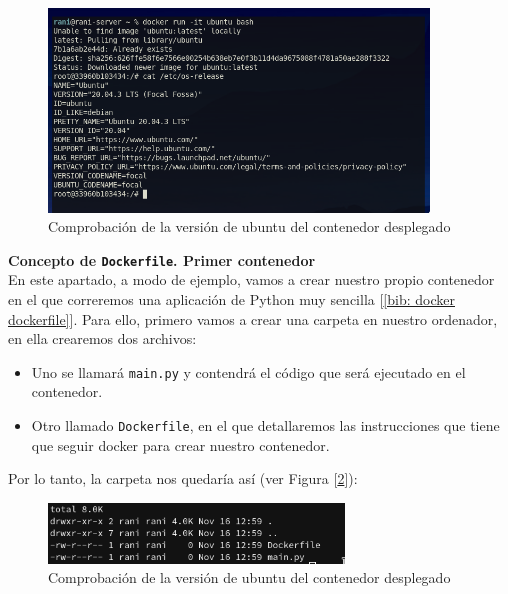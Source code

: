 \documentclass[a4paper, oneside, 12pt]{book}
\begin{document}
	\begin{figure}[h]
		\begin{center}
			\includegraphics[width=0.9\textwidth]{img/docker_ubuntu_ver.png}
			\caption{Comprobación de la versión de ubuntu del contenedor desplegado}
			\label{img: docker ubuntu ver}
		\end{center}
	\end{figure}

	\pagebreak

	\noindent \textbf{\large Concepto de \texttt{Dockerfile}. Primer contenedor}\\
	
	\noindent En este apartado, a modo de ejemplo, vamos a crear nuestro propio contenedor en el que correremos una aplicación de Python muy sencilla [\ref{bib: docker dockerfile}]. Para ello, primero vamos a crear una carpeta en nuestro ordenador, en ella crearemos dos archivos:
	\begin{itemize}
		\item Uno se llamará \texttt{main.py} y contendrá el código que será ejecutado en el contenedor.
		\item Otro llamado \texttt{Dockerfile}, en el que detallaremos las instrucciones que tiene que seguir docker para crear nuestro contenedor.
	\end{itemize}

	\noindent Por lo tanto, la carpeta nos quedaría así (ver Figura [\ref{img: docker file folder}]):
	
	\begin{figure}[h]
		\begin{center}
			\includegraphics[width=0.7\textwidth]{img/dockerfile_folder.png}
			\caption{Comprobación de la versión de ubuntu del contenedor desplegado}
			\label{img: docker file folder}
		\end{center}
	\end{figure}
	
\end{document}
